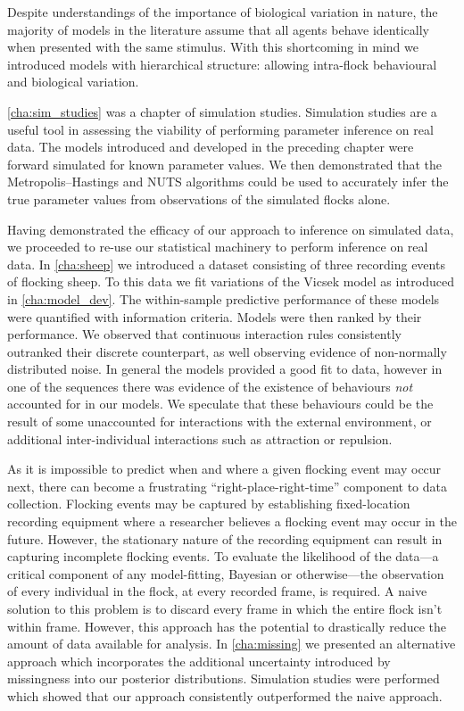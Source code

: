 Despite understandings of the importance of biological variation in nature, the
majority of models in the literature assume that all agents behave identically
when presented with the same stimulus. With this shortcoming in mind we
introduced models with hierarchical structure: allowing intra-flock behavioural
and biological variation.

\cref{cha:sim_studies} was a chapter of simulation studies. Simulation studies
are a useful tool in assessing the viability of performing parameter inference
on real data. The models introduced and developed in the preceding chapter
were forward simulated for known parameter values. We then demonstrated that
the Metropolis--Hastings and NUTS algorithms could be used to accurately infer
the true parameter values from observations of the simulated flocks alone.

Having demonstrated the efficacy of our approach to inference on simulated
data, we proceeded to re-use our statistical machinery to perform inference on
real data. In \cref{cha:sheep} we introduced a dataset consisting of three
recording events of flocking sheep. To this data we fit variations of the
Vicsek model as introduced in \cref{cha:model_dev}. The within-sample
predictive performance of these models were quantified with information
criteria. Models were then ranked by their performance. We observed that
continuous interaction rules consistently outranked their discrete counterpart,
as well observing evidence of non-normally distributed noise. In general the
models provided a good fit to data, however in one of the sequences there was
evidence of the existence of behaviours \emph{not} accounted for in our models.
We speculate that these behaviours could be the result of some unaccounted for
interactions with the external environment, or additional inter-individual
interactions such as attraction or repulsion.

As it is impossible to predict when and where a given flocking event may occur
next, there can become a frustrating ``right-place-right-time'' component to
data collection. Flocking events may be captured by establishing fixed-location
recording equipment where a researcher believes a flocking event may occur in
the future. However, the stationary nature of the recording equipment can
result in capturing incomplete flocking events. To evaluate the likelihood of
the data---a critical component of any model-fitting, Bayesian or
otherwise---the observation of every individual in the flock, at every recorded
frame, is required. A naive solution to this problem is to discard every frame
in which the entire flock isn't within frame. However, this approach has the
potential to drastically reduce the amount of data available for analysis. In
\cref{cha:missing} we presented an alternative approach which incorporates the
additional uncertainty introduced by missingness into our posterior
distributions. Simulation studies were performed which showed that our approach
consistently outperformed the naive approach.






